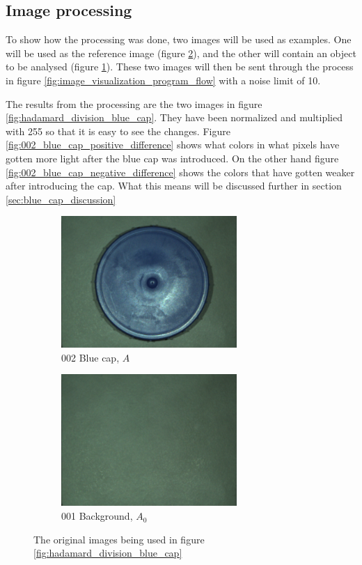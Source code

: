 \subsection{Image processing}

To show how the processing was done, two images will be used as examples. One will be used as the reference image (figure \ref{fig:001_background}), and the other will contain an object to be analysed (figure \ref{fig:002_blue_cap}). These two images will then be sent through the process in figure \ref{fig:image_visualization_program_flow} with a noise limit of 10. 

The results from the processing are the two images in figure \ref{fig:hadamard_division_blue_cap}. They have been normalized and multiplied with 255 so that it is easy to see the changes. %
Figure \ref{fig:002_blue_cap_positive_difference} shows what colors in what pixels have gotten more light after the blue cap was introduced. On the other hand figure \ref{fig:002_blue_cap_negative_difference} shows the colors that have gotten weaker after introducing the cap. What this means will be discussed further in section \ref{sec:blue_cap_discussion}

\begin{figure}[h]
    \begin{subfigure}{0.5\textwidth}
        \includegraphics[width=0.9\linewidth, height=5cm]{figures/camera_pictures_png/002_blue_cap.png}
        \caption{002 Blue cap, $A$}
        \label{fig:002_blue_cap}
    \end{subfigure}%
    \begin{subfigure}{0.5\textwidth}
        \includegraphics[width=0.9\linewidth, height=5cm]{figures/camera_pictures_png/001_background.png}
        \caption{001 Background, $A_0$}
        \label{fig:001_background}
    \end{subfigure}
    
    \caption{The original images being used in figure \ref{fig:hadamard_division_blue_cap}}
    \label{fig:blue_cap_and_background}
\end{figure}

